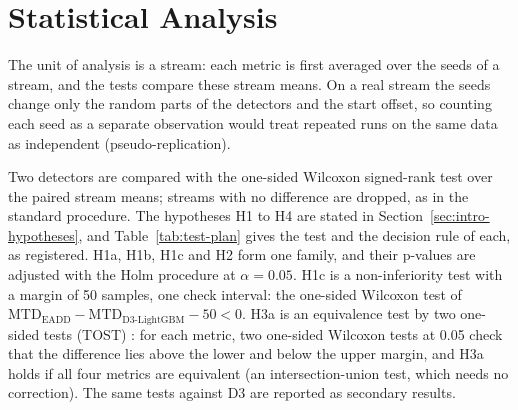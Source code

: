 \section{Statistical Analysis}
\label{sec:stats}
\label{sec:hypotheses}
The unit of analysis is a stream: each metric is first averaged over the seeds of a stream, and the tests compare these stream means. On a real stream the seeds change only the random parts of the detectors and the start offset, so counting each seed as a separate observation would treat repeated runs on the same data as independent (pseudo-replication).

Two detectors are compared with the one-sided Wilcoxon signed-rank test \citep{Wilcoxon1945} over the paired stream means; streams with no difference are dropped, as in the standard procedure. The hypotheses H1 to H4 are stated in Section~\ref{sec:intro-hypotheses}, and Table~\ref{tab:test-plan} gives the test and the decision rule of each, as registered. H1a, H1b, H1c and H2 form one family, and their p-values are adjusted with the Holm procedure \citep{Holm1979} at $\alpha = 0.05$. H1c is a non-inferiority test with a margin of 50 samples, one check interval: the one-sided Wilcoxon test of $\text{MTD}_{\text{EADD}} - \text{MTD}_{\text{D3-LightGBM}} - 50 < 0$. H3a is an equivalence test by two one-sided tests (TOST) \citep{Schuirmann1987}: for each metric, two one-sided Wilcoxon tests at 0.05 check that the difference lies above the lower and below the upper margin, and H3a holds if all four metrics are equivalent (an intersection-union test, which needs no correction). The same tests against D3 are reported as secondary results.

